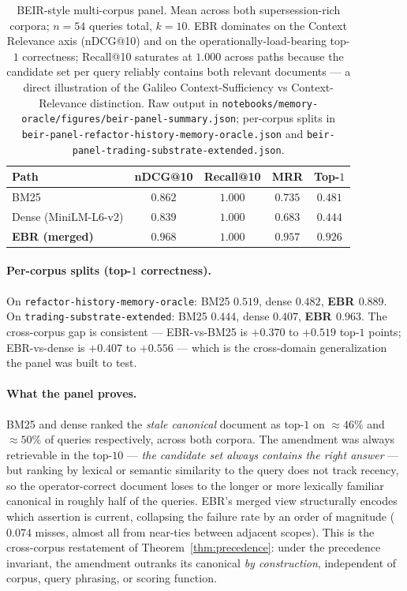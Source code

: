 \documentclass[runningheads]{llncs}
\begin{document}
\begin{table}[h]
\centering
\caption{BEIR-style multi-corpus panel. Mean across both
         supersession-rich corpora; $n=54$ queries total, $k=10$. EBR
         dominates on the Context Relevance axis (nDCG@10) and on the
         operationally-load-bearing top-$1$ correctness; Recall@10
         saturates at $1.000$ across paths because the candidate set
         per query reliably contains both relevant documents --- a
         direct illustration of the
         Galileo \cite{galileo2024rag} Context-Sufficiency vs
         Context-Relevance distinction. Raw output in
         \texttt{notebooks/memory-oracle/figures/beir-panel-summary.json};
         per-corpus splits in
         \texttt{beir-panel-refactor-history-memory-oracle.json} and
         \texttt{beir-panel-trading-substrate-extended.json}.}
\label{tab:beir-panel}
\small
\begin{tabular}{lcccc}
\toprule
\textbf{Path} & \textbf{nDCG@10} & \textbf{Recall@10} & \textbf{MRR} & \textbf{Top-$1$} \\
\midrule
BM25                  & $0.862$ & $1.000$ & $0.735$ & $0.481$ \\
Dense (MiniLM-L6-v2)  & $0.839$ & $1.000$ & $0.683$ & $0.444$ \\
\textbf{EBR (merged)} & $\mathbf{0.968}$ & $\mathbf{1.000}$ & $\mathbf{0.957}$ & $\mathbf{0.926}$ \\
\bottomrule
\end{tabular}
\end{table}

\paragraph{Per-corpus splits (top-$1$ correctness).} On
\texttt{refactor-history-memory-oracle}: BM25 $0.519$, dense
$0.482$, \textbf{EBR $0.889$}. On
\texttt{trading-substrate-extended}: BM25 $0.444$, dense $0.407$,
\textbf{EBR $0.963$}. The cross-corpus gap is consistent ---
EBR-vs-BM25 is $+0.370$ to $+0.519$ top-$1$ points; EBR-vs-dense is
$+0.407$ to $+0.556$ --- which is the cross-domain generalization
the panel was built to test.

\paragraph{What the panel proves.} BM25 and dense ranked the
\emph{stale canonical} document as top-$1$ on $\approx{}46\%$ and
$\approx{}50\%$ of queries respectively, across both corpora. The
amendment was always retrievable in the top-$10$ ---
\emph{the candidate set always contains the right answer} --- but
ranking by lexical or semantic similarity to the query does not track
recency, so the operator-correct document loses to the longer or
more lexically familiar canonical in roughly half of the queries.
EBR's merged view structurally encodes which assertion is current,
collapsing the failure rate by an order of magnitude
($0.074$ misses, almost all from near-ties between adjacent scopes).
This is the cross-corpus restatement of
Theorem~\ref{thm:precedence}: under the precedence invariant, the
amendment outranks its canonical \emph{by construction}, independent
of corpus, query phrasing, or scoring function.
\end{document}
